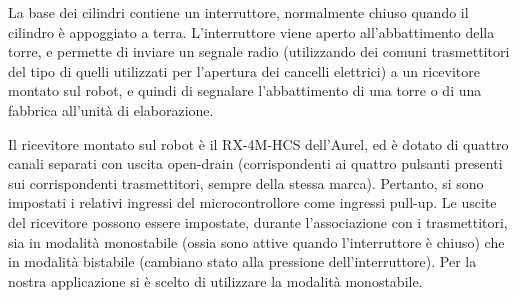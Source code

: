 La base dei cilindri contiene un interruttore, normalmente chiuso quando il cilindro è appoggiato a terra. L'interruttore viene aperto all'abbattimento della torre, e permette di inviare un segnale radio (utilizzando dei comuni trasmettitori del tipo di quelli utilizzati per l'apertura dei cancelli elettrici) a un ricevitore montato sul robot, e quindi di segnalare l'abbattimento di una torre o di una fabbrica all'unità di elaborazione.

Il ricevitore montato sul robot è il RX-4M-HCS dell'Aurel, ed è dotato di quattro canali separati con uscita open-drain (corrispondenti ai quattro pulsanti presenti sui corrispondenti trasmettitori, sempre della stessa marca). Pertanto, si sono impostati i relativi ingressi del microcontrollore come ingressi pull-up. Le uscite del ricevitore possono essere impostate, durante l'associazione con i trasmettitori, sia in modalità monostabile (ossia sono attive quando l'interruttore è chiuso) che in modalità bistabile (cambiano stato alla pressione dell'interruttore). Per la nostra applicazione si è scelto di utilizzare la modalità monostabile. 